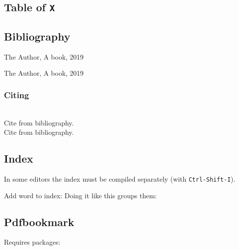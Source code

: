 \subsection{Table of \texttt{X}}
\begin{latex}
\tableofcontents
\listoffigures
\listoftables
\end{latex}

\subsection{Bibliography}
\begin{minipage}{0.6\textwidth}
\begin{latex}
\begin{thebibliography}{99}
   The Author, A book, 2019
\end{thebibliography}
\end{latex}
\end{minipage}
\begin{minipage}{0.4\textwidth}
\vspace*{-2.5cm}
\begin{thebibliography}{99}
   The Author, A book, 2019
\end{thebibliography}
\end{minipage}

\subsubsection{Citing}
\begin{latex}
\hrulefill\\
  Cite from bibliography\cite{author/19}.\\
  Cite from bibliography\cite[Chapter VI, VII]{author/19}.
\end{latex}

\subsection{Index}
In some editors the index must be compiled separately (with \texttt{Ctrl-Shift-I}).\\
\begin{latex}
\usepackage{makeidx}
\makeindex

\printindex

Add word to index: 
Doing it like this groups them:  
\end{latex}

\subsection{Pdfbookmark}
Requires packages: 

\begin{latex}
\end{latex}
